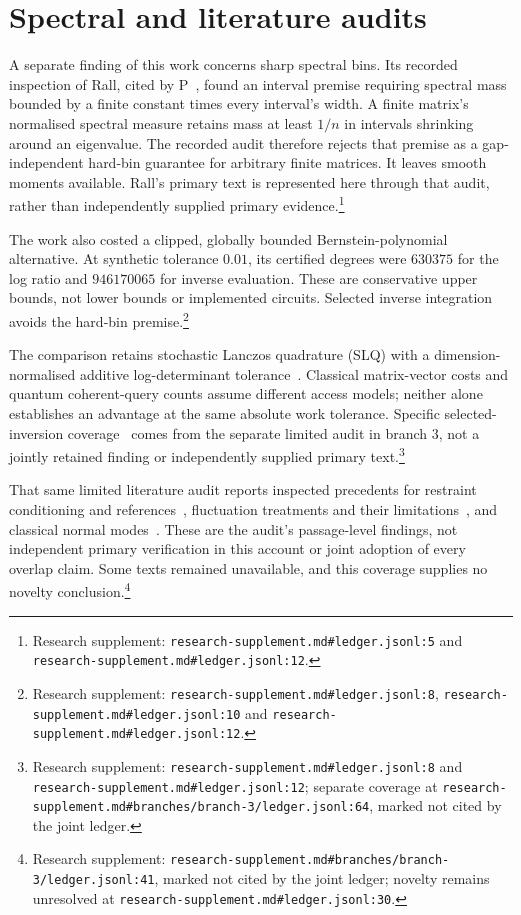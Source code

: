 \documentclass{article}
\begin{document}
\section{Spectral and literature audits}

A separate finding of this work concerns sharp spectral bins. Its recorded inspection of Rall, cited by P~\cite{Rall,P}, found an interval premise requiring spectral mass bounded by a finite constant times every interval's width. A finite matrix's normalised spectral measure retains mass at least \(1/n\) in intervals shrinking around an eigenvalue. The recorded audit therefore rejects that premise as a gap-independent hard-bin guarantee for arbitrary finite matrices. It leaves smooth moments available. Rall's primary text is represented here through that audit, rather than independently supplied primary evidence.\footnote{Research supplement: \nolinkurl{research-supplement.md\#ledger.jsonl:5} and \nolinkurl{research-supplement.md\#ledger.jsonl:12}.}

The work also costed a clipped, globally bounded Bernstein-polynomial alternative. At synthetic tolerance \(0.01\), its certified degrees were \(630375\) for the log ratio and \(946170065\) for inverse evaluation. These are conservative upper bounds, not lower bounds or implemented circuits. Selected inverse integration avoids the hard-bin premise.\footnote{Research supplement: \nolinkurl{research-supplement.md\#ledger.jsonl:8}, \nolinkurl{research-supplement.md\#ledger.jsonl:10} and \nolinkurl{research-supplement.md\#ledger.jsonl:12}.}

The comparison retains stochastic Lanczos quadrature (SLQ) with a dimension-normalised additive log-determinant tolerance~\cite{SLQ}. Classical matrix-vector costs and quantum coherent-query counts assume different access models; neither alone establishes an advantage at the same absolute work tolerance. Specific selected-inversion coverage~\cite{SelInv} comes from the separate limited audit in branch 3, not a jointly retained finding or independently supplied primary text.\footnote{Research supplement: \nolinkurl{research-supplement.md\#ledger.jsonl:8} and \nolinkurl{research-supplement.md\#ledger.jsonl:12}; separate coverage at \nolinkurl{research-supplement.md\#branches/branch-3/ledger.jsonl:64}, marked not cited by the joint ledger.}

That same limited literature audit reports inspected precedents for restraint conditioning and references~\cite{Woo,Gumbart,Ebrahimi}, fluctuation treatments and their limitations~\cite{Lee,Deng}, and classical normal modes~\cite{Lindahl}. These are the audit's passage-level findings, not independent primary verification in this account or joint adoption of every overlap claim. Some texts remained unavailable, and this coverage supplies no novelty conclusion.\footnote{Research supplement: \nolinkurl{research-supplement.md\#branches/branch-3/ledger.jsonl:41}, marked not cited by the joint ledger; novelty remains unresolved at \nolinkurl{research-supplement.md\#ledger.jsonl:30}.}



\end{document}
